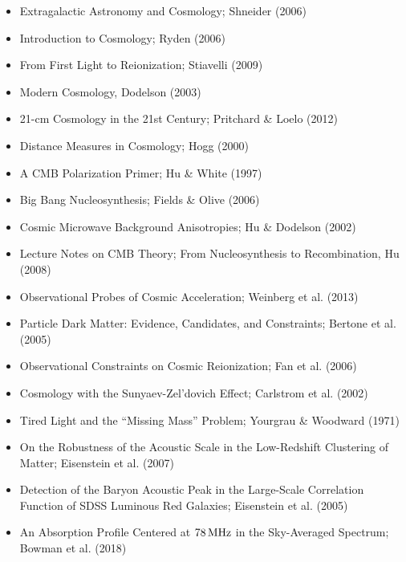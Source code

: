 \documentclass[a4paper,11pt]{article}
\begin{document}
\begin{itemize}
    \item Extragalactic Astronomy and Cosmology; Shneider (2006)
    \item Introduction to Cosmology; Ryden (2006)
    \item From First Light to Reionization; Stiavelli (2009)
    \item Modern Cosmology, Dodelson (2003)
    \item 21-cm Cosmology in the 21st Century; Pritchard \& Loelo (2012)
    \item Distance Measures in Cosmology; Hogg (2000)
    \item A CMB Polarization Primer; Hu \& White (1997)
    \item Big Bang Nucleosynthesis; Fields \& Olive (2006)
    \item Cosmic Microwave Background Anisotropies; Hu \& Dodelson (2002)
    \item Lecture Notes on CMB Theory; From Nucleosynthesis to Recombination, Hu (2008)
    \item Observational Probes of Cosmic Acceleration; Weinberg et al. (2013)
    \item Particle Dark Matter: Evidence, Candidates, and Constraints; Bertone et al. (2005)
    \item Observational Constraints on Cosmic Reionization; Fan et al. (2006)
    \item Cosmology with the Sunyaev-Zel'dovich Effect; Carlstrom et al. (2002)
    \item Tired Light and the ``Missing Mass'' Problem; Yourgrau \& Woodward (1971)
    \item On the Robustness of the Acoustic Scale in the Low-Redshift Clustering of Matter; Eisenstein et al. (2007)
    \item Detection of the Baryon Acoustic Peak in the Large-Scale Correlation Function of SDSS Luminous Red Galaxies; Eisenstein et al. (2005)
    \item An Absorption Profile Centered at $78\,{\rm MHz}$ in the Sky-Averaged Spectrum; Bowman et al. (2018)
\end{itemize}
\end{document}
